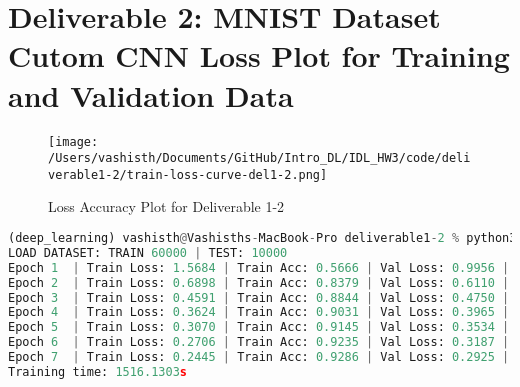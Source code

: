 
\section{Deliverable 2: MNIST Dataset Cutom CNN Loss Plot for Training and Validation Data}

\begin{solve}
    

    \begin{figure}[H]
        \centering
        \texttt{[image: /Users/vashisth/Documents/GitHub/Intro\_DL/IDL\_HW3/code/deliverable1-2/train-loss-curve-del1-2.png]}
        \caption{Loss Accuracy Plot for Deliverable 1-2}
    \end{figure}

\begin{lstlisting}[language=python, title=Train Logs, basicstyle=\scriptsize](deep_learning) vashisth@Vashisths-MacBook-Pro deliverable1-2 % python3 train.py 
LOAD DATASET: TRAIN 60000 | TEST: 10000
Epoch 1  | Train Loss: 1.5684 | Train Acc: 0.5666 | Val Loss: 0.9956 | Val Acc: 0.7626
Epoch 2  | Train Loss: 0.6898 | Train Acc: 0.8379 | Val Loss: 0.6110 | Val Acc: 0.8464
Epoch 3  | Train Loss: 0.4591 | Train Acc: 0.8844 | Val Loss: 0.4750 | Val Acc: 0.8694
Epoch 4  | Train Loss: 0.3624 | Train Acc: 0.9031 | Val Loss: 0.3965 | Val Acc: 0.8864
Epoch 5  | Train Loss: 0.3070 | Train Acc: 0.9145 | Val Loss: 0.3534 | Val Acc: 0.8954
Epoch 6  | Train Loss: 0.2706 | Train Acc: 0.9235 | Val Loss: 0.3187 | Val Acc: 0.9032
Epoch 7  | Train Loss: 0.2445 | Train Acc: 0.9286 | Val Loss: 0.2925 | Val Acc: 0.9080
Training time: 1516.1303s
\end{lstlisting}

\end{solve}